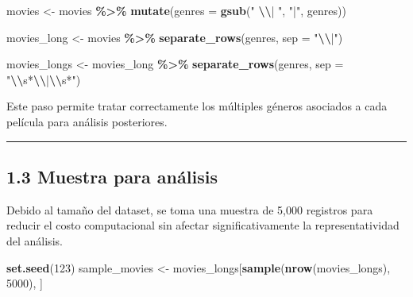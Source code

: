 \documentclass[
]{article}
\newenvironment{Shaded}{\begin{snugshade}}{\end{snugshade}}
\newcommand{\AttributeTok}[1]{\textcolor[rgb]{0.13,0.29,0.53}{#1}}
\newcommand{\DecValTok}[1]{\textcolor[rgb]{0.00,0.00,0.81}{#1}}
\newcommand{\FunctionTok}[1]{\textcolor[rgb]{0.13,0.29,0.53}{\textbf{#1}}}
\newcommand{\NormalTok}[1]{#1}
\newcommand{\OtherTok}[1]{\textcolor[rgb]{0.56,0.35,0.01}{#1}}
\newcommand{\SpecialCharTok}[1]{\textcolor[rgb]{0.81,0.36,0.00}{\textbf{#1}}}
\newcommand{\StringTok}[1]{\textcolor[rgb]{0.31,0.60,0.02}{#1}}
\begin{document}
\begin{Shaded}
\begin{Highlighting}[]
\NormalTok{movies }\OtherTok{\textless{}{-}}\NormalTok{ movies }\SpecialCharTok{\%\textgreater{}\%}
  \FunctionTok{mutate}\NormalTok{(}\AttributeTok{genres =} \FunctionTok{gsub}\NormalTok{(}\StringTok{" }\SpecialCharTok{\textbackslash{}\textbackslash{}}\StringTok{| "}\NormalTok{, }\StringTok{"|"}\NormalTok{, genres))}

\NormalTok{movies\_long }\OtherTok{\textless{}{-}}\NormalTok{ movies }\SpecialCharTok{\%\textgreater{}\%}
  \FunctionTok{separate\_rows}\NormalTok{(genres, }\AttributeTok{sep =} \StringTok{"}\SpecialCharTok{\textbackslash{}\textbackslash{}}\StringTok{|"}\NormalTok{)}

\NormalTok{movies\_longs }\OtherTok{\textless{}{-}}\NormalTok{ movies\_long }\SpecialCharTok{\%\textgreater{}\%}
  \FunctionTok{separate\_rows}\NormalTok{(genres, }\AttributeTok{sep =} \StringTok{"}\SpecialCharTok{\textbackslash{}\textbackslash{}}\StringTok{s*}\SpecialCharTok{\textbackslash{}\textbackslash{}}\StringTok{|}\SpecialCharTok{\textbackslash{}\textbackslash{}}\StringTok{s*"}\NormalTok{)}
\end{Highlighting}
\end{Shaded}

Este paso permite tratar correctamente los múltiples géneros asociados a
cada película para análisis posteriores.

\begin{center}\rule{0.5\linewidth}{0.5pt}\end{center}

\subsection{1.3 Muestra para análisis}\label{muestra-para-anuxe1lisis}

Debido al tamaño del dataset, se toma una muestra de 5,000 registros
para reducir el costo computacional sin afectar significativamente la
representatividad del análisis.

\begin{Shaded}
\begin{Highlighting}[]
\FunctionTok{set.seed}\NormalTok{(}\DecValTok{123}\NormalTok{)}
\NormalTok{sample\_movies }\OtherTok{\textless{}{-}}\NormalTok{ movies\_longs[}\FunctionTok{sample}\NormalTok{(}\FunctionTok{nrow}\NormalTok{(movies\_longs), }\DecValTok{5000}\NormalTok{), ]}
\end{Highlighting}
\end{Shaded}
\end{document}
